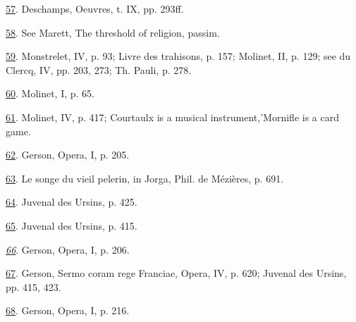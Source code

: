 \protect\hypertarget{23_NOTES.xhtmlux5cux23id_520}{\protect\hyperlink{18_Chapter_Eleven__THE_FORMS_OF_THO.xhtmlux5cux23id_519}{57}}.
Deschamps, Oeuvres, t. IX, pp. 293ff.

\protect\hypertarget{23_NOTES.xhtmlux5cux23id_518}{\protect\hyperlink{18_Chapter_Eleven__THE_FORMS_OF_THO.xhtmlux5cux23id_517}{58}}.
See Marett, The threshold of religion, passim.

\protect\hypertarget{23_NOTES.xhtmlux5cux23id_516}{\protect\hyperlink{18_Chapter_Eleven__THE_FORMS_OF_THO.xhtmlux5cux23id_515}{59}}.
Monstrelet, IV, p. 93; Livre des trahisons, p. 157; Molinet, II, p. 129;
see du Clercq, IV, pp. 203, 273; Th. Pauli, p. 278.

\protect\hypertarget{23_NOTES.xhtmlux5cux23id_514}{\protect\hyperlink{18_Chapter_Eleven__THE_FORMS_OF_THO.xhtmlux5cux23id_513}{60}}.
Molinet, I, p. 65.

\protect\hypertarget{23_NOTES.xhtmlux5cux23id_512}{\protect\hyperlink{18_Chapter_Eleven__THE_FORMS_OF_THO.xhtmlux5cux23id_511}{61}}.
Molinet, IV, p. 417; Courtaulx is a musical instrument,'Mornifle is a
card game.

\protect\hypertarget{23_NOTES.xhtmlux5cux23id_510}{\protect\hyperlink{18_Chapter_Eleven__THE_FORMS_OF_THO.xhtmlux5cux23id_509}{62}}.
Gerson, Opera, I, p. 205.

\protect\hypertarget{23_NOTES.xhtmlux5cux23page_431}{\protect\hyperlink{18_Chapter_Eleven__THE_FORMS_OF_THO.xhtmlux5cux23id_508}{63}}.
Le songe du vieil pelerin, in Jorga, Phil. de Mézières, p. 691.

\protect\hypertarget{23_NOTES.xhtmlux5cux23id_507}{\protect\hyperlink{18_Chapter_Eleven__THE_FORMS_OF_THO.xhtmlux5cux23id_506}{64}}.
Juvenal des Ursins, p. 425.

\protect\hypertarget{23_NOTES.xhtmlux5cux23id_505}{\protect\hyperlink{18_Chapter_Eleven__THE_FORMS_OF_THO.xhtmlux5cux23id_504}{65}}.
Juvenal des Ursins, p. 415.

\emph{\protect\hypertarget{23_NOTES.xhtmlux5cux23id_503}{\protect\hyperlink{18_Chapter_Eleven__THE_FORMS_OF_THO.xhtmlux5cux23id_502}{66}}}.
Gerson, Opera, I, p. 206.

\protect\hypertarget{23_NOTES.xhtmlux5cux23id_501}{\protect\hyperlink{18_Chapter_Eleven__THE_FORMS_OF_THO.xhtmlux5cux23id_500}{67}}.
Gerson, Sermo coram rege Franciae, Opera, IV, p. 620; Juvenal des
Ursins, pp. 415, 423.

\protect\hypertarget{23_NOTES.xhtmlux5cux23id_499}{\protect\hyperlink{18_Chapter_Eleven__THE_FORMS_OF_THO.xhtmlux5cux23id_498}{68}}.
Gerson, Opera, I, p. 216.

